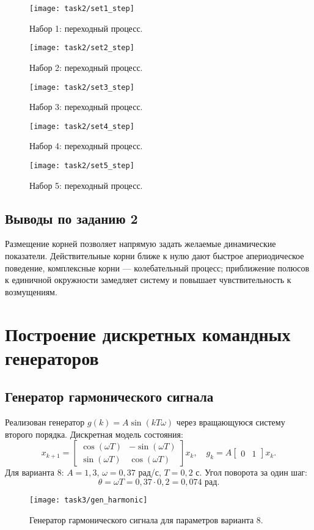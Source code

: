 \begin{figure}[H]
  \centering
  \texttt{[image: task2/set1\_step]}
  \caption{Набор 1: переходный процесс.}
  \label{fig:task2_set1}
\end{figure}
\begin{figure}[H]
  \centering
  \texttt{[image: task2/set2\_step]}
  \caption{Набор 2: переходный процесс.}
  \label{fig:task2_set2}
\end{figure}
\begin{figure}[H]
  \centering
  \texttt{[image: task2/set3\_step]}
  \caption{Набор 3: переходный процесс.}
  \label{fig:task2_set3}
\end{figure}
\begin{figure}[H]
  \centering
  \texttt{[image: task2/set4\_step]}
  \caption{Набор 4: переходный процесс.}
  \label{fig:task2_set4}
\end{figure}
\begin{figure}[H]
  \centering
  \texttt{[image: task2/set5\_step]}
  \caption{Набор 5: переходный процесс.}
  \label{fig:task2_set5}
\end{figure}

\section*{Выводы по заданию 2}
Размещение корней позволяет напрямую задать желаемые динамические показатели. Действительные корни ближе к нулю дают быстрое апериодическое поведение, комплексные корни — колебательный процесс; приближение полюсов к единичной окружности замедляет систему и повышает чувствительность к возмущениям.

\chapter{Построение дискретных командных генераторов}
\section{Генератор гармонического сигнала}
Реализован генератор \(g(k) = A\sin(kT\omega)\) через вращающуюся систему второго порядка. Дискретная модель состояния:
\[
  x_{k+1} = \begin{bmatrix} \cos(\omega T) & -\sin(\omega T) \\ \sin(\omega T) & \cos(\omega T) \end{bmatrix} x_k, \quad g_k = A \begin{bmatrix} 0 & 1 \end{bmatrix} x_k.
\]
Для варианта 8: \(A = 1{,}3\), \(\omega = 0{,}37\) рад/с, \(T = 0{,}2\) с. Угол поворота за один шаг:
\[
  \theta = \omega T = 0{,}37 \cdot 0{,}2 = 0{,}074 \text{ рад}.
\]
\begin{figure}[H]
  \centering
  \texttt{[image: task3/gen\_harmonic]}
  \caption{Генератор гармонического сигнала для параметров варианта 8.}
\end{figure}

